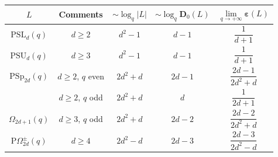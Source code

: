\documentclass{daj}
\theoremstyle{definition}
\theoremstyle{remark}
\newcommand{\PSL}{\mathrm{PSL}}
\newcommand{\D}{\mathbf{D}}
\renewcommand{\a}{\boldsymbol{\varepsilon}}
\begin{document}
{\small 

\begin{table}[ht]
	\centering
	\begin{tabular}{| c c | c c c |}
		\hline
		
		\phantom{$\dfrac{1^1}{1_{1_1}}$}\hspace{-6mm}
		$L$ & Comments & $\sim \log_q|L|$ & $\sim \log_q \D_0(L)$ & $\lim \limits_{q \rightarrow+\infty} \a(L)$ \\
		
		\hline \hline
		
		\phantom{$\dfrac{1^1}{1_{1_1}}$}\hspace{-6mm}
		$\PSL_d(q)$ & $d\geq 2$ & $d^2-1$ & $d-1$ & $\dfrac{1}{d+1}$ \\
		
		\phantom{$\dfrac{1^1}{1_{1_1}}$}\hspace{-6mm}
		$\mathrm{PSU}_d(q)$ & $d\geq 3$ & $d^2-1$ & $d-1$ & $\dfrac{1}{d+1}$ \\
		
		\phantom{$\dfrac{1^1}{1_{1_1}}$}\hspace{-6mm}
		$\mathrm{PSp}_{2d}(q)$ & $d\geq 2$, $q$ even & $2d^2+d$ & $2d-1$ & $\dfrac{2d-1}{2d^2+d}$ \\
		
		\phantom{$\dfrac{1^1}{1_{1_1}}$}\hspace{-6mm}
		& $d\geq 2$, $q$ odd & $2d^2+d$ & $d$ & $\dfrac{1}{2d+1}$ \\
		
		\phantom{$\dfrac{1^1}{1_{1_1}}$}\hspace{-6mm}
		$\Omega_{2d+1}(q)$& $d\geq 3$, $q$ odd & $2d^2+d$ & $2d-2$ & $\dfrac{2d-2}{2d^2+d}$ \\
		
		\phantom{$\dfrac{1^1}{1_{1_1}}$}\hspace{-6mm}
		$\mathrm{P}\Omega^{\pm}_{2d}(q)$& $d\geq 4$ & $2d^2-d$ & $2d-3$ & $\dfrac{2d-3}{2d^2-d}$ \\
		
		\hline
	\end{tabular}
\end{table}




\begin{table}[ht]
	\centering
	\begin{tabular}{| c c | c c c |}
		\hline
		

\end{tabular}
\end{table}}
\end{document}
